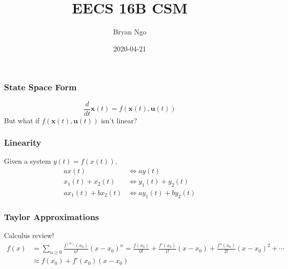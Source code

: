 \documentclass[aspectratio=169]{beamer}
\title{EECS 16B CSM}
\author{Bryan Ngo}
\date{2020-04-21}
\institute{UC Berkeley}
\newcommand{\diff}[1]{\frac{d}{d #1}}
\begin{document}
\begin{frame}
    \maketitle
\end{frame}

\begin{frame}
    \frametitle{State Space Form}

    \begin{equation}
        \diff{t} \bm{x}(t) = f(\bm{x}(t), \bm{u}(t))
    \end{equation}
    But what if \(f(\bm{x}(t), \bm{u}(t))\) isn't linear?
\end{frame}

\begin{frame}
    \frametitle{Linearity}

    Given a system \(y(t) = f(x(t))\),
    \begin{align}
        a x(t) &\iff a y(t) \\
        x_1(t) + x_2(t) &\iff y_1(t) + y_2(t) \\
        a x_1(t) + b x_2(t) &\iff a y_1(t) + b y_2(t)
    \end{align}
\end{frame}

\begin{frame}
    \frametitle{Taylor Approximations}

    Calculus review!
    \begin{align}
        f(x) &= \sum_{n \geqslant 0} \frac{f^{(n)}(x_0)}{n!} (x - x_0)^n = \frac{f(x_0)}{0!} + \frac{f'(x_0)}{1!} (x - x_0) + \frac{f''(x_0)}{2!} (x - x_0)^2 + \cdots \\
        &\approx f(x_0) + f'(x_0) (x - x_0)
    \end{align}
\end{frame}
\end{document}
